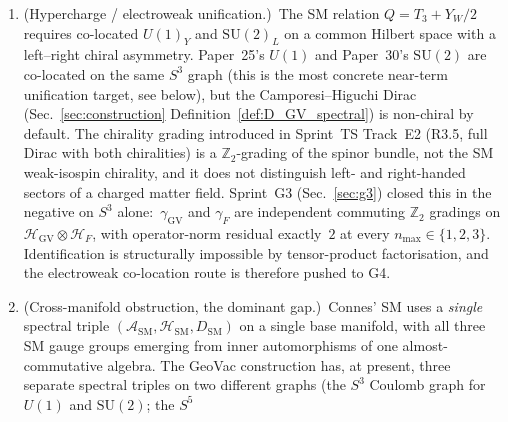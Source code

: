 \documentclass[11pt]{article}
\begin{document}
\begin{enumerate}
finite-resolution feature of the truncated operator system itself;
inner fluctuations are defined operationally as $\omega + J\omega
J^{-1}$ with $\omega = \sum_i a_i [D, b_i]$, which uses ALGEBRA
elements (the multiplier matrices, which are an algebra over
$\mathbb{C}$ at the level of $M_{\dim H}(\mathbb{C})$ even though
their span $\mathcal{O}_{n_{\max}}$ is not closed under multiplication),
so the $a \cdot b \notin \mathcal{O}$ feature does not block the
fluctuation calculus.
Sprint~H1 (Sec.~\ref{sec:higgs_h1}) closes this gap up to the
Yukawa-undetermined verdict; Sprint~G3 (Sec.~\ref{sec:g3}) supplies
the structural reason that $Y$ is undetermined --- $\gamma_{\mathrm{GV}}$
and $\gamma_F$ are independent commuting $\mathbb{Z}_2$ gradings, the
Yukawa lives on the $\gamma_F$ flip, and no GeoVac-side data couples
to that flip.  G2 and G3 are therefore one structural fact, not two.
\item[\textbf{G3}] (Hypercharge / electroweak unification.)\ The SM
relation $Q = T_3 + Y_W/2$ requires co-located $U(1)_Y$ and
$\mathrm{SU}(2)_L$ on a common Hilbert space with a left--right
chiral asymmetry.  Paper~25's $U(1)$ and Paper~30's
$\mathrm{SU}(2)$ are co-located on the same $S^3$ graph (this is
the most concrete near-term unification target, see below), but
the Camporesi--Higuchi Dirac (Sec.~\ref{sec:construction}
Definition~\ref{def:D_GV_spectral}) is non-chiral by default.  The
chirality grading introduced in Sprint~TS Track~E2 (R3.5, full
Dirac with both chiralities) is a $\mathbb{Z}_2$-grading of the
spinor bundle, not the SM weak-isospin chirality, and it does not
distinguish left- and right-handed sectors of a charged matter
field.
Sprint~G3 (Sec.~\ref{sec:g3}) closed this in the negative on $S^3$
alone:\ $\gamma_{\mathrm{GV}}$ and $\gamma_F$ are independent commuting
$\mathbb{Z}_2$ gradings on $\mathcal{H}_{\mathrm{GV}} \otimes
\mathcal{H}_F$, with operator-norm residual exactly~$2$ at every
$n_{\max} \in \{1, 2, 3\}$.  Identification is structurally
impossible by tensor-product factorisation, and the electroweak
co-location route is therefore pushed to G4.
\item[\textbf{G4}] (Cross-manifold obstruction, the dominant gap.)\
Connes' SM uses a \emph{single} spectral triple
$(\mathcal{A}_{\mathrm{SM}}, \mathcal{H}_{\mathrm{SM}},
D_{\mathrm{SM}})$ on a single base manifold, with all three SM
gauge groups emerging from inner automorphisms of one
almost-commutative algebra.  The GeoVac construction has, at
present, three separate spectral triples on two different graphs
(the $S^3$ Coulomb graph for $U(1)$ and $\mathrm{SU}(2)$; the $S^5$

\end{enumerate}
\end{document}
